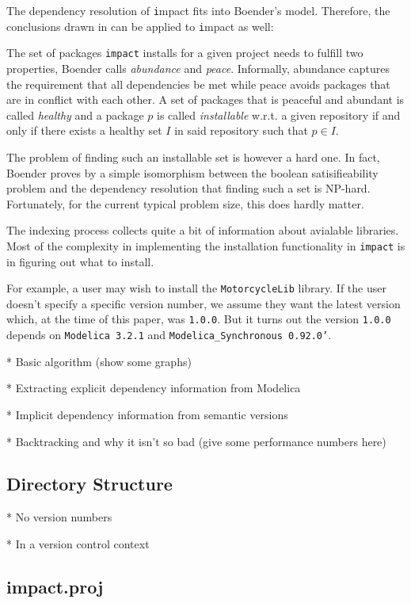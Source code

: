 \documentclass[11pt,a4paper,twocolumn]{article}
\newcommand{\impact}{\texttt{impact}} %
\newcommand{\code}[1]{\texttt{#1}} %
\begin{document}
The dependency resolution of {\code impact} fits into Boender's model.
Therefore, the conclusions drawn in \cite{boender2011formal} can be
applied to {\code impact} as well:

The set of packages {\impact} installs for a given project needs to
fulfill two properties, Boender calls {\em abundance} and {\em peace}.
Informally, abundance captures the requirement that all dependencies
be met while peace avoids packages that are in conflict with each
other.  A set of packages that is peaceful and abundant is called {\em
  healthy} and a package $p$ is called {\em installable} w.r.t. a
given repository if and only if there exists a healthy set $I$ in said
repository such that $p \in I$.

The problem of finding such an installable set is however a hard one.
In fact, Boender proves by a simple isomorphism between the boolean
satisifieability problem and the dependency resolution that finding
such a set is NP-hard.  Fortunately, for the current typical problem
size, this does hardly matter.

The indexing process collects quite a bit of information about
avialable libraries.  Most of the complexity in implementing the
installation functionality in \code{impact} is in figuring out {\be
  what} to install.

For example, a user may wish to install the
\code{MotorcycleLib} library.  If the user doesn't specify a
specific version number, we assume they want the latest version which,
at the time of this paper, was \code{1.0.0}.  But it turns out the
version \code{1.0.0} depends on \code{Modelica 3.2.1} and
\code{Modelica\_Synchronous 0.92.0'}.

* Basic algorithm (show some graphs)

* Extracting explicit dependency information from Modelica

* Implicit dependency information from semantic versions

* Backtracking and why it isn't so bad (give some performance numbers here)

\subsection{Directory Structure}

* No version numbers

* In a version control context

\subsection{impact.proj}
\end{document}

